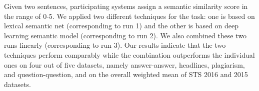 Given two sentences, participating systems assign a semantic similarity score in the range of 0-5. We applied two different techniques for the task: one is based on lexical semantic net (corresponding to run 1) and the other is based on deep learning semantic model (corresponding to run 2). We also combined these two runs linearly (corresponding to run 3). Our results indicate that the two techniques perform comparably while the combination outperforms the individual ones on four out of five datasets, namely answer-answer, headlines, plagiarism, and question-question, and on the overall weighted mean of STS 2016 and 2015 datasets.
